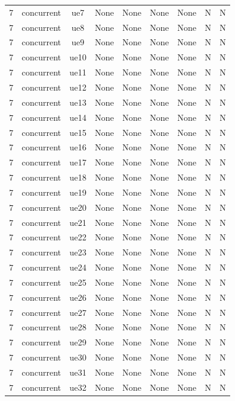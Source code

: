 \begin{table}[ht]
\begin{tabular}{|c|c|c|c|c|c|c|c|c|}
7 & concurrent & ue7 & None & None & None & None & N & N \\
7 & concurrent & ue8 & None & None & None & None & N & N \\
7 & concurrent & ue9 & None & None & None & None & N & N \\
7 & concurrent & ue10 & None & None & None & None & N & N \\
7 & concurrent & ue11 & None & None & None & None & N & N \\
7 & concurrent & ue12 & None & None & None & None & N & N \\
7 & concurrent & ue13 & None & None & None & None & N & N \\
7 & concurrent & ue14 & None & None & None & None & N & N \\
7 & concurrent & ue15 & None & None & None & None & N & N \\
7 & concurrent & ue16 & None & None & None & None & N & N \\
7 & concurrent & ue17 & None & None & None & None & N & N \\
7 & concurrent & ue18 & None & None & None & None & N & N \\
7 & concurrent & ue19 & None & None & None & None & N & N \\
7 & concurrent & ue20 & None & None & None & None & N & N \\
7 & concurrent & ue21 & None & None & None & None & N & N \\
7 & concurrent & ue22 & None & None & None & None & N & N \\
7 & concurrent & ue23 & None & None & None & None & N & N \\
7 & concurrent & ue24 & None & None & None & None & N & N \\
7 & concurrent & ue25 & None & None & None & None & N & N \\
7 & concurrent & ue26 & None & None & None & None & N & N \\
7 & concurrent & ue27 & None & None & None & None & N & N \\
7 & concurrent & ue28 & None & None & None & None & N & N \\
7 & concurrent & ue29 & None & None & None & None & N & N \\
7 & concurrent & ue30 & None & None & None & None & N & N \\
7 & concurrent & ue31 & None & None & None & None & N & N \\
7 & concurrent & ue32 & None & None & None & None & N & N \\

\end{tabular}
\end{table}
